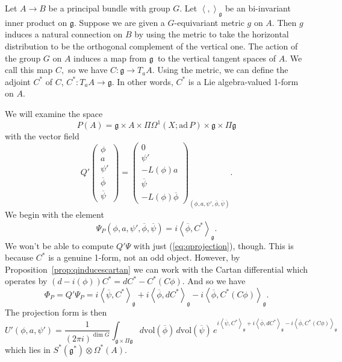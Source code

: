 \documentclass[twoside]{amsart}
\renewcommand{\eqref}[1]{(\ref{eq:#1})}
\newcommand{\propref}[1]{Proposition~\ref{prop:#1}}
\newcommand{\enm}[1]{\ensuremath{#1}}
\newcommand{\g}{\enm{\mathfrak{g}}}
\newcommand{\ip}[2]{\enm{\left<#1,#2\right>}}
\renewcommand{\bar}[1]{\overline{#1}}
\newcommand{\ad}{\enm{\mathrm{ad}}}
\newcommand{\formsij}[2]{\ensuremath{\Omega^{#1}({#2})}}
\newcommand{\adp}{\enm{\ad\,P}}
\begin{document}
Let \( A\to B \) be a principal bundle with group \( G \).  Let \(
\ip{}{}_{\g} \) be an bi-invariant inner product on \g.  Suppose we
are given a \( G \)-equivariant metric \( g \) on \( A \).  Then \( g
\) induces a natural connection on \( B \) by using the metric to take
the horizontal distribution to be the orthogonal complement of the
vertical one.  The action of the group \( G \) on \( A \) induces a
map from \g\ to the vertical tangent spaces of \( A \).  We call this
map \( C, \) so we have \( C:\g\to T_{a}A. \) Using the metric, we can
define the adjoint \( C^{*} \) of \( C \), \( C^{*}:T_{a}A\to\g \).
In other words, \( C^{*} \) is a Lie algebra-valued 1-form on \( A \).

We will examine the space
\[ P(A) = \g\times A\times\Pi \Omega^{1}(X; \adp)\times\g\times\Pi\g \]
with the vector field
\begin{equation}
    Q'\left(
    \begin{array}{c}
	\phi \\
	a \\
	\psi' \\
	\bar{\phi} \\
	\bar{\psi}
    \end{array}
    \right) = \left(
    \begin{array}{c}
	0 \\ \psi' \\ -L(\phi)a \\ \bar{\psi} \\ -L(\phi)\bar{\phi}
    \end{array}
    \right)_{(\phi,a,\psi',\bar{\phi},\bar{\psi})}.
    \label{eq:qprojection}
\end{equation}
We begin with the element
\begin{equation}
    \Psi_{P}(\phi,a,\psi',\bar{\phi},\bar{\psi}) =
    i\ip{\bar{\phi}}{C^{*}}_{\g}.
    \label{eq:psiprojection}
\end{equation}
We won't be able to compute \( Q'\Psi \) with just
\eqref{qprojection},
though.  This is because \( C^{*} \) is a genuine 1-form, not an odd
object.  However, by \propref{qinducescartan} we can work with
the Cartan differential which operates by \( (d-i(\phi))C^{*} =
dC^{*} - C^{*}(C\phi). \)  And so we have
\begin{equation}
    \Phi_{P} = Q'\Psi_{P} = i\ip{\bar{\psi}}{C^{*}}_{\g}
    + i\ip{\bar{\phi}}{dC^{*}}_{\g}
    - i\ip{\bar{\phi}}{C^{*}(C\phi)}_{\g}.
    \label{eq:phiprojection1}
\end{equation}
The projection form is then
\begin{equation}
    U'(\phi, a, \psi') = \frac{1}{(2\pi i)^{\dim
G}}\int_{\g\times\Pi\g}
    d\mathrm{vol}(\bar{\phi})\,d\mathrm{vol}(\bar{\psi})\,e^{
    i\ip{\bar{\psi}}{C^{*}}_{\g}
    + i\ip{\bar{\phi}}{dC^{*}}_{\g}
    - i\ip{\bar{\phi}}{C^{*}(C\phi)}_{\g}}
    \label{eq:phiprojection}
\end{equation}
which lies in \( S^{*}(\g^{*})\otimes\formsij{*}{A}. \)
\end{document}
